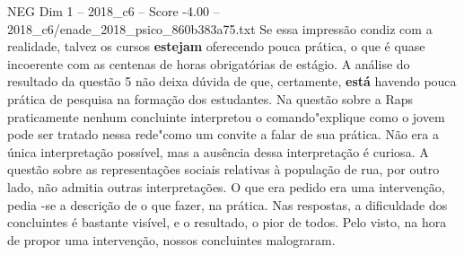 \begin{textsample}{NEG Dim 1 – 2018\_c6 – Score -4.00 – 2018\_c6/enade\_2018\_psico\_860b383a75.txt}
Se essa impressão condiz com a realidade, talvez os cursos \textbf{estejam} oferecendo pouca prática, o que é quase incoerente com as centenas de horas obrigatórias de estágio.
A análise do resultado da questão 5 não deixa dúvida de que, certamente, \textbf{está} havendo pouca prática de pesquisa na formação dos estudantes.
Na questão sobre a Raps praticamente nenhum concluinte interpretou o comando"explique como o jovem pode ser tratado nessa rede"como um convite a falar de sua prática.
Não era a única interpretação possível, mas a ausência dessa interpretação é curiosa.
A questão sobre as representações sociais relativas à população de rua, por outro lado, não admitia outras interpretações.
O que era pedido era uma intervenção, pedia -se a descrição de o que fazer, na prática.
Nas respostas, a dificuldade dos concluintes é bastante visível, e o resultado, o pior de todos.
Pelo visto, na hora de propor uma intervenção, nossos concluintes malograram.

\end{textsample}
